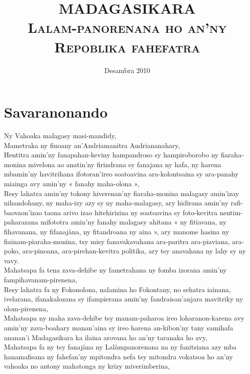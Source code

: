 \documentclass[12pt]{article}
\title{{\Huge MADAGASIKARA}\\\textsc{Lalam-panorenana ho an'ny\\Repoblika fahefatra}}
\date{Desambra 2010}
\begin{document}
\maketitle{}

\section*{Savaranonando}
\label{sec:savaranonando}

Ny Vahoaka malagasy masi-mandidy,\\

\noindent
Mametraka ny finoany an'Andriamanitra Andriananahary,\\

\noindent
Hentitra amin'ny fanapahan-keviny hampandroso sy hampiroborobo ny fiaraha-monina
mivelona ao anatin'ny firindrana sy fanajana ny hafa, ny harena mbamin'ny
havitrihana ifotoran'ireo soatoavina ara-kolontsaina sy ara-panahy miainga avy
amin'ny « fanahy maha-olona »,\\

\noindent
Resy lahatra amin'ny tokony hiverenan'ny fiaraha-monina malagasy amin'izay
nihandohany, ny maha-izy azy sy ny maha-malagasy, ary hidirana amin'ny
rafi-baovaon'izao taona arivo izao hitehirizina ny soatoavina sy foto-kevitra
nentim-paharazana mifototra amin'ny fanahy malagasy ahitana « ny fitiavana, ny
fihavanana, ny fifanajàna, ny fitandroana ny aina », ary manome hasina ny
fiainam-piaraha-monina, tsy misy fanavakavahana ara-paritra ara-piaviana,
ara-poko, ara-pinoana, ara-pirehan-kevitra politika, ary tsy anavahana ny lahy
sy ny vavy.\\

\noindent
Mahatsapa fa tena zava-dehibe ny fametrahana ny fomba izorana amin'ny
fampihavanam-pirenena,\\

\noindent
Resy lahatra fa ny Fokonolona, nalamina ho Fokontany, no sehatra iainana,
ivelarana, ifanakalozana sy ifampierana amin'ny fandraisan'anjara mavitriky ny
olom-pirenena,\\

\noindent
Mahatsapa ny maha zava-dehibe tsy manam-paharoa ireo loharanon-karena avy
amin'ny zava-boahary manan'aina sy ireo harena an-kibon'ny tany samihafa
ananan'i Madagasikara ka ilaina arovana ho an'ny taranaka ho avy,\\

\noindent
Mahatsapa fa ny tsy fanajàna ny Lalàmpanorenana na ny fanitsiana azy mba
hanamafisana ny fahefan'ny mpitondra nefa tsy mitondra vokatsoa ho an'ny vahoaka
no antony mahatonga ny krizy miverimberina,\\
\end{document}
